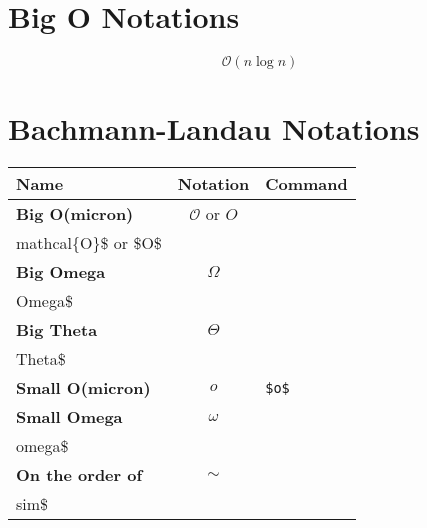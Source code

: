 \documentclass[10pt,fleqn]{article}
\newcommand{\bslash}{\char`\\}
\begin{document}
\section*{Big O Notations}

\[\mathcal{O}(n\log{n})\]

\section*{Bachmann-Landau Notations}
\setlength{\tabcolsep}{12pt}
\renewcommand*{\arraystretch}{1.2}
\begin{tabular}{|l|c|l|}
\hline
Name & Notation & Command \\ \hline
\textbf{Big O(micron)} & $\mathcal{O}$ or $O$ & \texttt{\$\bslash mathcal\{O\}\$ or \$O\$}\\ \hline
\textbf{Big Omega} & $\Omega$ & \texttt{\$\bslash Omega\$}\\ \hline
\textbf{Big Theta} & $\Theta$ & \texttt{\$\bslash Theta\$}\\ \hline
\textbf{Small O(micron)} & $o$ & \texttt{\$o\$}\\ \hline
\textbf{Small Omega} & $\omega$ & \texttt{\$\bslash omega\$}\\ \hline
\textbf{On the order of} & $\sim$ & \texttt{\$\bslash sim\$}\\ \hline
\end{tabular}
\end{document}
